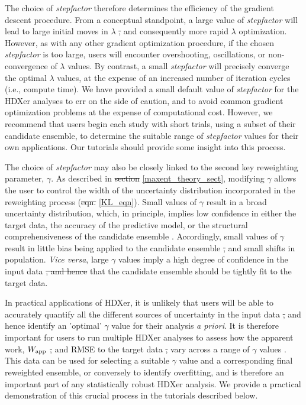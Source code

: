 \documentclass[9pt,tutorial]{livecoms}
\providecommand{\DIFadd}[1]{{\protect\color{blue}\uwave{#1}}} %
\providecommand{\DIFdel}[1]{{\protect\color{red}\sout{#1}}}                      %
\providecommand{\DIFaddbegin}{} %
\providecommand{\DIFaddend}{} %
\providecommand{\DIFdelbegin}{} %
\providecommand{\DIFdelend}{} %
\begin{document}
The choice of \textit{stepfactor} therefore determines the efficiency of the gradient descent procedure. 
From a conceptual standpoint, a large value of \textit{stepfactor} will lead to large initial moves in $\lambda$ \DIFdelbegin \DIFdel{, }\DIFdelend and consequently more rapid $\lambda$ optimization.
However, as with any other gradient optimization procedure, if the chosen \textit{stepfactor} is too large, users will encounter overshooting, oscillations, or non-convergence of $\lambda$ values.
By contrast, a small \textit{stepfactor} will precisely converge the optimal $\lambda$ values, \DIFaddbegin \DIFadd{but }\DIFaddend at the expense of an increased number of iteration cycles (i.e., compute time).
We have provided a small default value of \textit{stepfactor} for the HDXer analyses to err on the side of caution, and to avoid common gradient optimization problems at the expense of computational cost.
However, we recommend that users begin each study with short trials, using a subset of their candidate ensemble, to determine the suitable range of \textit{stepfactor} values for their own applications.
Our tutorials should provide some insight into this process.

The choice of \textit{stepfactor} may also be closely linked to the second key reweighting parameter, $\gamma$.
As described in \DIFdelbegin \DIFdel{section }\DIFdelend \DIFaddbegin \DIFadd{Section }\DIFaddend \ref{maxent_theory_sect}, modifying $\gamma$ allows the user to control the width of the uncertainty distribution incorporated in the reweighting process (\DIFdelbegin \DIFdel{eqn. }\DIFdelend \DIFaddbegin \DIFadd{Equation }\DIFaddend \ref{KL_eqn}).
Small values of $\gamma$ result in a broad uncertainty distribution, which, in principle, implies low confidence in either the target data, the accuracy of the predictive model, or the structural comprehensiveness of the candidate ensemble \cite{Orioli2020, Hummer2015}.
Accordingly, small values of $\gamma$ result in little bias being applied to the candidate ensemble \DIFdelbegin \DIFdel{, }\DIFdelend and small shifts in population.
\textit{Vice versa}, large $\gamma$ values imply a high degree of confidence in the input data \DIFdelbegin \DIFdel{, and hence }\DIFdelend \DIFaddbegin \DIFadd{and thus }\DIFaddend that the candidate ensemble should be tightly fit to the target data.

In practical applications of HDXer, it is unlikely that users will be able to accurately quantify all the different sources of uncertainty in the input data \DIFdelbegin \DIFdel{, }\DIFdelend and hence identify an 'optimal' $\gamma$ value for their analysis \textit{a priori}.
It is therefore important for users to run multiple HDXer analyses to assess how the apparent work, $W_\textnormal{app}$ \DIFdelbegin \DIFdel{, }\DIFdelend and RMSE to the target data \DIFdelbegin \DIFdel{, }\DIFdelend vary across a range of $\gamma$ values \cite{Orioli2020}.
This data can be used for selecting a suitable $\gamma$ value and a corresponding final reweighted ensemble, or conversely to identify overfitting, and is therefore an important part of any statistically robust HDXer analysis.
We provide a practical demonstration of this crucial process in the tutorials described below.
\end{document}
